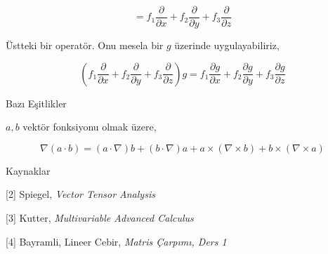 \documentclass[12pt,fleqn]{article}\usepackage{../../common}
\begin{document}
$$
= f_1 \frac{\partial }{\partial x} +
f_2 \frac{\partial }{\partial y} +
f_3 \frac{\partial }{\partial z} 
$$

Üstteki bir operatör. Onu mesela bir $g$ üzerinde uygulayabiliriz,

$$
(f_1 \frac{\partial }{\partial x} +
f_2 \frac{\partial }{\partial y} +
f_3 \frac{\partial }{\partial z}) 
g = 
f_1 \frac{\partial g}{\partial x} +
f_2 \frac{\partial g}{\partial y} +
f_3 \frac{\partial g}{\partial z} 
$$



Bazı Eşitlikler

$a,b$ vektör fonksiyonu olmak üzere, 

$$
\nabla (a \cdot b) = 
(a \cdot \nabla) b + (b \cdot \nabla) a + 
a \times (\nabla \times b) + 
b \times (\nabla \times a)
$$









Kaynaklar 

[2] Spiegel, {\em Vector Tensor Analysis}

[3] Kutter, {\em Multivariable Advanced Calculus}

[4] Bayramli, Lineer Cebir, {\em Matris Çarpımı, Ders 1}
\end{document}
